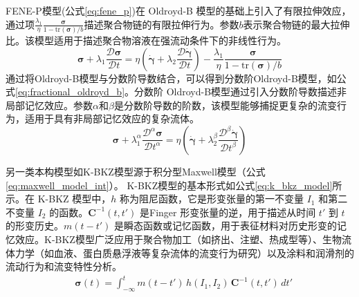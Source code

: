 FENE-P模型(公式\eqref{eq:fene_p})在 Oldroyd-B 模型的基础上引入了有限拉伸效应，通过项$\frac{\lambda_1}{\eta} \frac{\boldsymbol{\sigma}}{1 - \text{tr}(\boldsymbol{\sigma})/b}$描述聚合物链的有限拉伸行为\cite{bird1980polymer}。参数$b$表示聚合物链的最大拉伸比。该模型适用于描述聚合物溶液在强流动条件下的非线性行为。
\begin{equation}
  \boldsymbol{\sigma} + \lambda_1 \frac{\mathcal{D}\boldsymbol{\sigma}}{\mathcal{D}t} = \eta \left( \dot{\boldsymbol{\gamma}} + \lambda_2 \frac{\mathcal{D}\dot{\boldsymbol{\gamma}}}{\mathcal{D}t} \right) - \frac{\lambda_1}{\eta} \frac{\boldsymbol{\sigma}}{1 - \text{tr}(\boldsymbol{\sigma})/b} \label{eq:fene_p}
\end{equation}
通过将Oldroyd-B模型与分数阶导数结合，可以得到分数阶Oldroyd-B模型，如公式\eqref{eq:fractional_oldroyd_b}。分数阶 Oldroyd-B模型通过引入分数阶导数描述非局部记忆效应\cite{qi2007stokes}。参数$\alpha$和$\beta$是分数阶导数的阶数，该模型能够捕捉更复杂的流变行为，适用于具有非局部记忆效应的复杂流体。
\begin{equation}
  \boldsymbol{\sigma} + \lambda_1^\alpha \frac{\mathcal{D}^\alpha \boldsymbol{\sigma}}{\mathcal{D}t^\alpha} = \eta \left( \dot{\boldsymbol{\gamma}} + \lambda_2^\beta \frac{\mathcal{D}^\beta \dot{\boldsymbol{\gamma}}}{\mathcal{D}t^\beta} \right) \label{eq:fractional_oldroyd_b}
\end{equation}

另一类本构模型如K-BKZ模型源于积分型Maxwell模型（公式\eqref{eq:maxwell_model_int}）\cite{kaye1962non,bernstein1963study}。
K-BKZ模型的基本形式如公式\eqref{eq:k_bkz_model}所示。在 K-BKZ 模型中，$h$ 称为阻尼函数，它是形变张量的第一不变量 $I_1$ 和第二不变量 $I_2$ 的函数。$\mathbf{C}^{-1}(t,t')$ 是Finger 形变张量的逆，用于描述从时间 $t'$ 到 $t$ 的形变历史。$m(t-t')$ 是瞬态函数或记忆函数，用于表征材料对历史形变的记忆效应。K-BKZ模型广泛应用于聚合物加工（如挤出、注塑、热成型等）、生物流体力学（如血液、蛋白质悬浮液等复杂流体的流变行为研究）以及涂料和润滑剂的流动行为和流变特性分析\cite{mitsoulis60YearsKayeBernstein2023}。
\begin{align}
   & \boldsymbol{\sigma}(t)  = \int_{-\infty}^t m(t-t') \, h(I_1, I_2) \, \mathbf{C}^{-1}(t,t') \, dt'    \label{eq:k_bkz_model}
\end{align}

